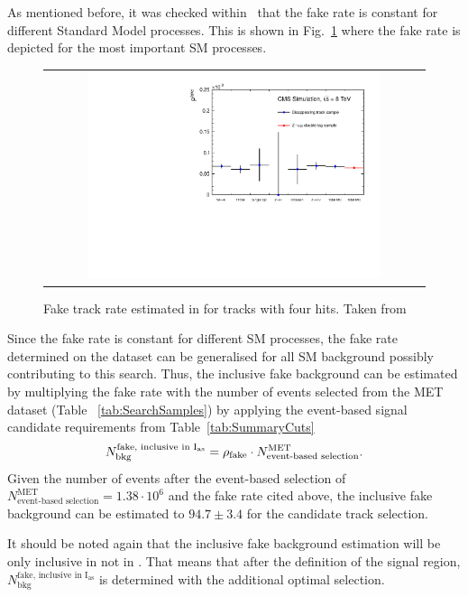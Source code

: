 As mentioned before, it was checked within~\cite{bib:CMS:DT_Thesis,bib:CMS:DT_8TeV_AN} that the fake rate is constant for different Standard Model processes.
This is shown in Fig.~\ref{fig:FakeRate} where the fake rate is depicted for the most important SM processes.
\begin{figure}[!t]
  \centering 
  \begin{tabular}{c}
    \includegraphics[width=0.79\textwidth]{figures/analysis/Background/fakeTrkRates.pdf}
  \end{tabular}
  \caption{Fake track rate estimated in \cite{bib:CMS:DT_Thesis,bib:CMS:DT_8TeV_AN} for tracks with four hits. Taken from \cite{bib:CMS:DT_8TeV_AN} }
  \label{fig:FakeRate}
\end{figure}
Since the fake rate is constant for different SM processes, the fake rate determined on the \Zlep dataset can be generalised for all SM background possibly contributing to this search.
Thus, the inclusive fake background can be estimated by multiplying the fake rate with the number of events selected from the MET dataset (Table ~\ref{tab:SearchSamples}) by applying the event-based signal candidate requirements from Table~\ref{tab:SummaryCuts}
\begin{equation}
N^{\text{fake, inclusive in I$_{\text{as}}$}}_{\text{bkg}} = \rho_{\text{fake}} \cdot N_{\text{event-based selection}}^{\text{MET}}.
\end{equation}
Given the number of events after the event-based selection of $N_{\text{event-based selection}}^{\text{MET}} = 1.38\cdot10^6$ and the fake rate cited above, 
the inclusive fake background can be estimated to $94.7\pm3.4$ for the candidate track selection.

It should be noted again that the inclusive fake background estimation will be only inclusive in \ias not in \pt.
That means that after the definition of the signal region, $N^{\text{fake, inclusive in I$_{\text{as}}$}}_{\text{bkg}}$ is determined with the additional optimal \pt selection.

